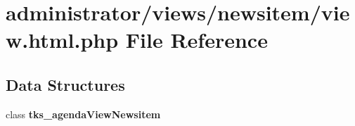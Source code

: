 \section{administrator/views/newsitem/view.html.\+php File Reference}
\label{administrator_2views_2newsitem_2view_8html_8php}
\subsection*{Data Structures}
\begin{DoxyCompactItemize}
\item 
class \textbf{ tks\+\_\+agenda\+View\+Newsitem}
\end{DoxyCompactItemize}
